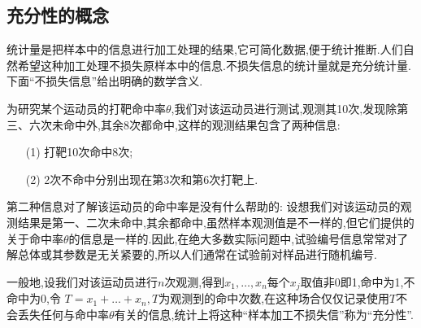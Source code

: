 \subsection{充分性的概念\label{ssec:5.5.1}}
统计量是把样本中的信息进行加工处理的结果,它可简化数据,便于统计推断.人们自然希望这种加工处理不损失原样本中的信息.不损失信息的统计量就是充分统计量.下面``不损失信息''给出明确的数学含义.
\begin{example}\label{exam:5.5.1}
为研究某个运动员的打靶命中率$\theta$,我们对该运动员进行测试,观测其10次,发现除第三、六次未命中外,其余8次都命中,这样的观测结果包含了两种信息:
\begin{enumerate}
\item[(1)] 打靶10次命中8次;
\item[(2)] 2次不命中分别出现在第3次和第6次打靶上.
\end{enumerate}

第二种信息对了解该运动员的命中率是没有什么帮助的: 设想我们对该运动员的观测结果是第一、二次未命中,其余都命中,虽然样本观测值是不一样的,但它们提供的关于命中率$\theta$的信息是一样的.因此,在绝大多数实际问题中,试验编号信息常常对了解总体或其参数是无关紧要的,所以人们通常在试验前对样品进行随机编号.
\end{example}

一般地,设我们对该运动员进行$n$次观测,得到$x_1,\dotsc,x_n$每个$x_j$取值非0即1,命中为1,不命中为0,令
$T=x_1+\dotsc+x_n,T$为观测到的命中次数,在这种场合仅仅记录使用$T$不会丢失任何与命中率$\theta$有关的信息,统计上将这种``样本加工不损失信''称为``充分性''.

